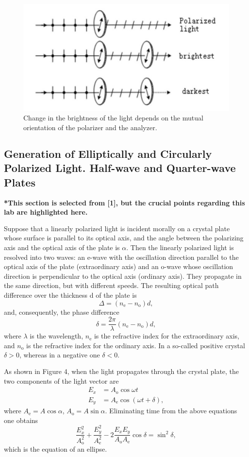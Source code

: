 \documentclass{article}
\begin{document}
\begin{figure}[H]\centering
\includegraphics[scale=1.0]{polar.png}
\caption{Change in the brightness of the light depends on the mutual orientation of the polarizer and the analyzer.}\label{FigMalus}
\end{figure}

\subsection{Generation of Elliptically and Circularly Polarized Light. Half-wave and Quarter-wave Plates}
\small{\textbf{*This section is selected from [1], but the crucial points regarding this lab are highlighted here.}}

\vspace*{0.1cm}

Suppose that a linearly polarized light is incident morally on a crystal plate whose surface is parallel to its optical axis, and the angle between the polarizing axis and the optical axis of the plate is $\alpha$. Then the linearly polarized light is resolved into two waves: an e-wave with the oscillation direction parallel to the optical axis of the plate (extraordinary axis) and an o-wave whose oscillation direction is perpendicular to the optical axis (ordinary axis). They propagate in the same direction, but with different speeds. The resulting optical path difference over the thickness d of the plate is
$$\Delta = (n_\text{e} - n_\text{o})d,$$
and, consequently, the phase difference
$$\delta = \frac{2\pi}{\lambda}(n_\text{e} - n_\text{o})d,$$ 
where $\lambda$ is the wavelength, $n_\text{e}$ is the refractive index for the extraordinary axis, and $n_\text{o}$ is the refractive index for the ordinary axis. In a so-called positive crystal $\delta > 0$, whereas in a negative one $\delta < 0$.

As shown in Figure 4, when the light propagates through the crystal plate, the two components of the light vector are
\begin{align*}
E_x &= A_\text{o}\cos\omega t\\
E_y &= A_\text{e}\cos(\omega t + \delta),
\end{align*}
where $A_\text{e} = A\cos\alpha$, $A_\text{o} = A\sin\alpha$. Eliminating time from the above equations one obtains
\begin{equation}\label{eqE}
\frac{E_x^2}{A_\text{o}^2} + \frac{E_y^2}{A_\text{e}^2} - 2\frac{E_xE_y}{A_\text{o}A_\text{e}}\cos \delta = \sin^2\delta,
\end{equation}
which is the equation of an ellipse.
\end{document}
